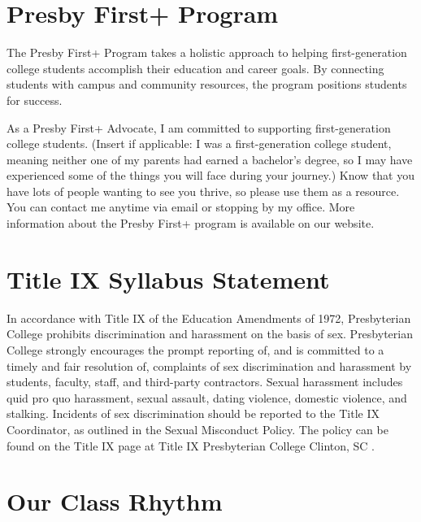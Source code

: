 \documentclass[
]{book}
\begin{document}
\hypertarget{presby-first-program}{%
\section*{Presby First+ Program}\label{presby-first-program}}

The Presby First+ Program takes a holistic approach to helping first-generation college students accomplish their education and career goals. By connecting students with campus and community resources, the program positions students for success.

As a Presby First+ Advocate, I am committed to supporting first-generation college students. (Insert if applicable: I was a first-generation college student, meaning neither one of my parents had earned a bachelor's degree, so I may have experienced some of the things you will face during your journey.) Know that you have lots of people wanting to see you thrive, so please use them as a resource. You can contact me anytime via email or stopping by my office. More information about the Presby First+ program is available on our website.

\hypertarget{title-ix-syllabus-statement}{%
\section*{Title IX Syllabus Statement}\label{title-ix-syllabus-statement}}

In accordance with Title IX of the Education Amendments of 1972, Presbyterian College prohibits discrimination and harassment on the basis of sex. Presbyterian College strongly encourages the prompt reporting of, and is committed to a timely and fair resolution of, complaints of sex discrimination and harassment by students, faculty, staff, and third-party contractors. Sexual harassment includes quid pro quo harassment, sexual assault, dating violence, domestic violence, and stalking. Incidents of sex discrimination should be reported to the Title IX Coordinator, as outlined in the Sexual Misconduct Policy. The policy can be found on the Title IX page at Title IX \textbar{} Presbyterian College \textbar{} Clinton, SC .

\hypertarget{our-class-rhythm}{%
\section*{Our Class Rhythm}\label{our-class-rhythm}}
\end{document}
